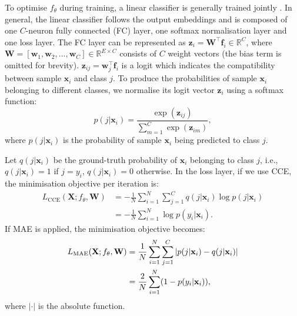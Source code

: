 \documentclass{article}
\begin{document}
To optimise $f_{\theta}$ during training, a linear classifier is generally trained jointly \cite{liu2016large}. In general, the linear classifier follows the output embeddings and is composed of one $C$-neuron fully connected (FC) layer, one softmax normalisation layer and one loss layer. The FC layer can be represented as $\mathbf{z}_i = \mathbf{W}^\top \mathbf{f}_i \in \mathbb{R}^C$, where $\mathbf{W} = [\mathbf{w}_1, \mathbf{w}_2, ..., \mathbf{w}_C] \in \mathbb{R}^{E\times C}$ consists of $C$ weight vectors (the bias term is omitted for brevity). $\mathbf{z}_{ij} = \mathbf{w}_j^\top \mathbf{f}_i$ is a logit which indicates the compatibility between sample $\mathbf{x}_i$ and class $j$. To produce the probabilities of sample $\mathbf{x}_i$ belonging to different classes, we normalise its logit vector $\mathbf{z}_i$ using a softmax function: 
\begin{equation}
	\label{eq:probability}
	p(j|\mathbf{x}_i) = \frac{\exp(\mathbf{z}_{ij})}{\sum_{m=1}^{C} \exp(\mathbf{z}_{im})} ,
\end{equation} 
where $p(j|\mathbf{x}_i)$ is the probability of sample $\mathbf{x}_i$ being predicted to class $j$. 

Let $q(j|\mathbf{x}_i)$ be the ground-truth probability of $\mathbf{x}_i$ belonging to class $j$, i.e., $q(j|\mathbf{x}_i)=1$ if $j=y_i$, $q(j|\mathbf{x}_i)=0$ otherwise. In the loss layer, if we use CCE, the minimisation objective per iteration is: 
\begin{equation}
	\label{eq:loss_CCE}
	\begin{aligned}
		L_{\mathrm{CCE}} (\mathbf{X};f_\theta,\mathbf{W}) 
&= 	- \frac{1}{N} \sum_{i=1}^N \sum_{j=1}^{C} q(j|\mathbf{x}_i) \log p(j|\mathbf{x}_i) \\
		&= 	
- \frac{1}{N} \sum_{i=1}^N \log p(y_i|\mathbf{x}_i)
		. 
	\end{aligned}
\end{equation}
If MAE is applied, the minimisation objective becomes: 
\vspace{-0.3cm}
\begin{equation}
\vspace{-0.2cm}
	\label{eq:loss_MAE}
	\begin{aligned}
		L_{\mathrm{MAE}} (\mathbf{X};f_\theta,\mathbf{W}) 
&= 	 \frac{1}{N} \sum_{i=1}^N \sum_{j=1}^{C}
		|p(j|\mathbf{x}_i)- q(j|\mathbf{x}_i) |
		\\
		&= 	 \frac{2}{N} \sum_{i=1}^N 
		(1-p(y_i|\mathbf{x}_i))
		,
	\end{aligned}
\end{equation}
where $|\cdot|$ is the absolute function. 
\end{document}
